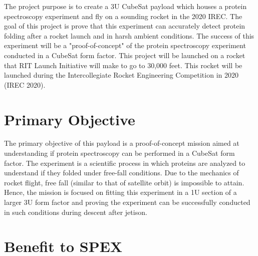 \documentclass[conference]{IEEEtran} %
\begin{document}
The project purpose is to create a 3U CubeSat payload which houses a protein spectroscopy experiment and fly on a sounding rocket in the 2020 IREC. The goal of this project is prove that 
this experiment can accurately detect protein folding after a rocket launch and in harsh ambient conditions. The success of this experiment will be a "proof-of-concept" of the protein spectroscopy
experiment conducted in a CubeSat form factor. This project will be launched on a rocket that RIT Launch Initiative will make to go to 30,000 feet. This rocket will be launched during the 
Intercollegiate Rocket Engineering Competition in 2020 (IREC 2020). 

\section{Primary Objective}
\label{sec:primary-obj}

The primary objective of this payload is a proof-of-concept mission aimed at understanding if protein spectroscopy can be performed in a CubeSat form factor. The experiment
is a scientific process in which proteins are analyzed to understand if they folded under free-fall conditions. Due to the mechanics of rocket flight, free fall (similar to that
of satellite orbit) is impossible to attain. Hence, the mission is focused on fitting this experiment in a 1U section of a larger 3U form factor and proving the experiment can be 
successfully conducted in such conditions during descent after jetison. 

\section{Benefit to SPEX}
\label{sec:benefit}
\end{document}
